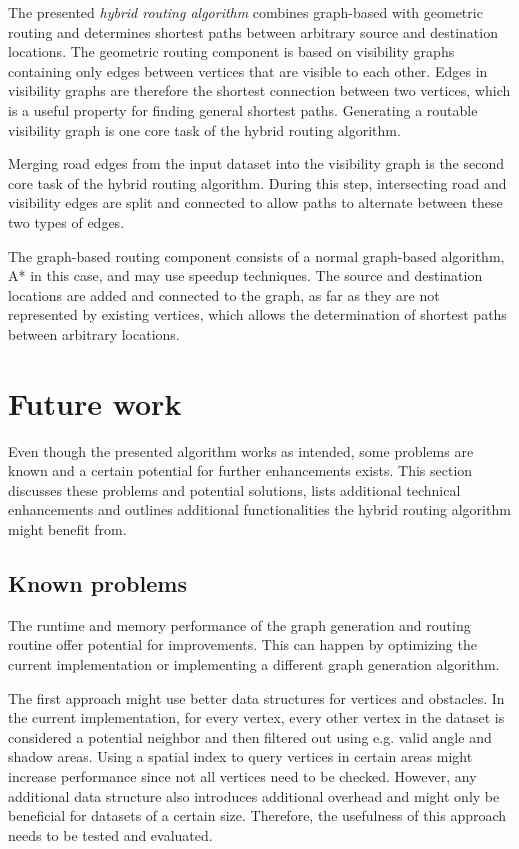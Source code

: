 
The presented \emph{hybrid routing algorithm} combines graph-based with geometric routing and determines shortest paths between arbitrary source and destination locations.
The geometric routing component is based on visibility graphs containing only edges between vertices that are visible to each other.
Edges in visibility graphs are therefore the shortest connection between two vertices, which is a useful property for finding general shortest paths.
Generating a routable visibility graph is one core task of the hybrid routing algorithm.

Merging road edges from the input dataset into the visibility graph is the second core task of the hybrid routing algorithm.
During this step, intersecting road and visibility edges are split and connected to allow paths to alternate between these two types of edges.

The graph-based routing component consists of a normal graph-based algorithm, A* in this case, and may use speedup techniques.
The source and destination locations are added and connected to the graph, as far as they are not represented by existing vertices, which allows the determination of shortest paths between arbitrary locations.
	
\section{Future work}
\label{sec:future-work}

	Even though the presented algorithm works as intended, some problems are known and a certain potential for further enhancements exists.
	This section discusses these problems and potential solutions, lists additional technical enhancements and outlines additional functionalities the hybrid routing algorithm might benefit from.

	\subsection{Known problems}
	
		The runtime and memory performance of the graph generation and routing routine offer potential for improvements.
		This can happen by optimizing the current implementation or implementing a different graph generation algorithm.
		
		The first approach might use better data structures for vertices and obstacles.
		In the current implementation, for every vertex, every other vertex in the dataset is considered a potential neighbor and then filtered out using e.g. valid angle and shadow areas.
		Using a spatial index to query vertices in certain areas might increase performance since not all vertices need to be checked.
		However, any additional data structure also introduces additional overhead and might only be beneficial for datasets of a certain size.
		Therefore, the usefulness of this approach needs to be tested and evaluated.
		
